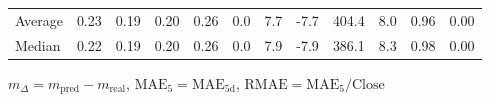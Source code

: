 \begin{threeparttable}
{\begin{tabular}{lrrrrrrrrrrr}
Average &          0.23 &          0.19 &          0.20 &        0.26 &                 0.0 &                 7.7 &       -7.7 &               404.4 &              8.0 &            0.96 &                   0.00 \\
 Median &          0.22 &          0.19 &          0.20 &        0.26 &                 0.0 &                 7.9 &       -7.9 &               386.1 &              8.3 &            0.98 &                   0.00 \\
\bottomrule
\end{tabular}
}
\begin{tablenotes}\footnotesize
\item $m_\Delta=m_{\text{pred}}-m_{\text{real}}$,
$\mathrm{MAE}_5=\mathrm{MAE}_{5\text{d}}$,
$\mathrm{RMAE}=\mathrm{MAE}_5/\text{Close}$
\end{tablenotes}
\end{threeparttable}
\endgroup

